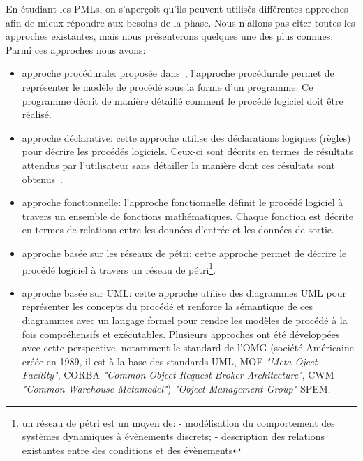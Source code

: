 En étudiant les PMLs, on s'aperçoit qu'ils peuvent utilisés différentes approches afin de mieux répondre aux besoins de la phase. Nous n'allons pas citer toutes les approches existantes, mais nous présenterons quelques une des plus connues. Parmi ces approches nous avons:
\begin{itemize}
\item approche procédurale: proposée dans~\cite{lo}, l'approche procédurale permet de représenter le modèle de procédé sous la forme d'un programme. Ce programme décrit de manière détaillé comment le procédé logiciel doit être réalisé.
\item approche déclarative: cette approche utilise des déclarations logiques (règles) pour décrire les procédés logiciels. Ceux-ci sont décrits en termes de résultats attendus par l'utilisateur sans détailler la manière dont ces résultats sont obtenus~\cite{lgw}.
\item approche fonctionnelle: l'approche fonctionnelle définit le procédé logiciel à travers un ensemble de fonctions mathématiques. Chaque fonction est décrite en termes de relations entre les données d'entrée et les données de sortie. 
\item approche basée sur les réseaux de pétri: cette approche permet de décrire le procédé logiciel à travers un réseau de pétri\footnote{un réseau de pétri est un moyen de: - modélisation du comportement des systèmes dynamiques à évènements discrets; - description des relations existantes entre des conditions et des évènements}.
\item approche basée sur UML: cette approche utilise des diagrammes UML pour représenter les concepts du procédé et renforce la sémantique de ces diagrammes avec un langage formel pour rendre les modèles de procédé à la fois compréhensifs et exécutables. 
Plusieurs approches ont été développées avec cette perspective, notamment le standard de l'OMG (société Américaine créée en 1989, il est à la base des standards UML, MOF \textit{"Meta-Oject Facility"}, CORBA \textit{"Common Object Request Broker Architecture"}, CWM \textit{"Common Warehouse Metamodel"}) \textit{"Object Management Group"} SPEM.

\end{itemize}

